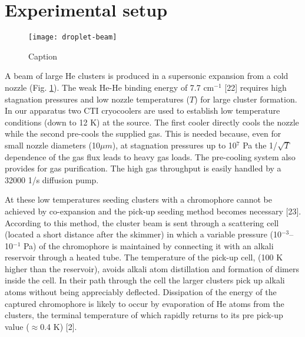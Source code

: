 	\section{Experimental setup}

		\begin{figure}[t]
			\begin{center}
				\texttt{[image: droplet-beam]}
				\caption{Caption}
				\label{fig:droplet-beam}
			\end{center}
		\end{figure}
		
		\lettrine[lines=3,findent=3pt,nindent=0pt]{A}{} beam of large He clusters is produced in a supersonic expansion from a cold nozzle (Fig. \ref{fig:droplet-beam}). The weak He-He binding energy of 7.7 cm$^{-1}$ [22] requires high stagnation pressures and low nozzle temperatures ($T$) for large cluster formation. In our apparatus two CTI cryocoolers are used to establish low temperature conditions (down to 12 K) at the source. The first cooler directly cools the nozzle while the second pre-cools the supplied gas. This is needed because, even for small nozzle diameters (10$\unit{\mu m}$), at stagnation pressures up to 10$^7$ Pa the 1/$\sqrt{T}$ dependence of the gas flux leads to heavy gas loads. The pre-cooling system also provides for gas purification. The high gas throughput is easily handled by a 32000 1/s diffusion pump.
		
		At these low temperatures seeding clusters with a chromophore cannot be achieved by co-expansion and the pick-up seeding method becomes necessary [23]. According to this method, the cluster beam is sent through a scattering cell (located a short distance after the skimmer) in which a variable pressure (10$^{-3}$--10$^{-1}$ Pa) of the chromophore is maintained by connecting it with an alkali reservoir through a heated tube. The temperature of the pick-up cell, (100 K higher than the reservoir), avoids alkali atom distillation and formation of dimers inside the cell. In their path through the cell the larger clusters pick up alkali atoms without being appreciably deflected. Dissipation of the energy of the captured chromophore is likely to occur by evaporation of He atoms from the clusters, the terminal temperature of which rapidly returns to its pre pick-up value ($\approx$0.4 K) [2].
	
